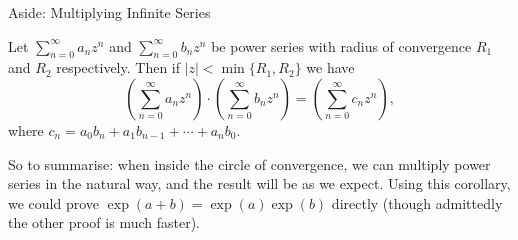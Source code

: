 \begin{aside}{Aside: Multiplying Infinite Series}
\begin{corollary*}
	Let $\sum_{n = 0}^{\infty} a_n z^n$ and $\sum_{n = 0}^{\infty} b_n z^n$ be power series with radius of convergence $R_1$ and $R_2$ respectively. Then if $|z| < \min\{R_1, R_2\}$ we have
	$$
	\left(\sum_{n = 0}^{\infty} a_n z^n\right) \cdot \left(\sum_{n = 0}^{\infty} b_n z^n\right) = \left(\sum_{n = 0}^{\infty} c_n z^n\right),
	$$
	where $c_n = a_0 b_n + a_1 b_{n - 1} + \cdots + a_n b_0$.
\end{corollary*}

So to summarise: when inside the circle of convergence, we can multiply power series in the natural way, and the result will be as we expect. Using this corollary, we could prove $\exp(a + b) = \exp(a) \exp(b)$ directly (though admittedly the other proof is much faster).





\end{aside}

